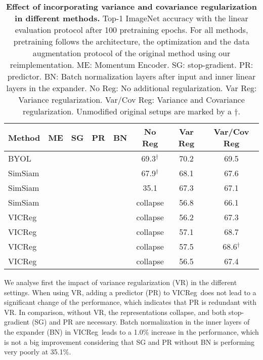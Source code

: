 \documentclass{article}
\makeatletter
\newcommand{\algo}{VICReg}
\newcommand{\expander}{expander }
\newcommand{\expandernospace}{expander}
\newcommand{\cmark}{\ding{51}}\newcommand{\bigcell}[2]{\begin{tabular}{@{}#1@{}}#2\end{tabular}}
\makeatother
\begin{document}
\begin{table}[t]
\caption{\textbf{Effect of incorporating variance and covariance regularization in different methods.} Top-1 ImageNet accuracy with the linear evaluation protocol after 100 pretraining epochs. For all methods, pretraining follows the architecture, the optimization and the data augmentation protocol of the original method using our reimplementation. ME: Momentum Encoder. SG: stop-gradient. PR: predictor. BN: Batch normalization layers after input and inner linear layers in the \expandernospace. No Reg: No additional regularization. Var Reg: Variance regularization. Var/Cov Reg: Variance and Covariance regularization. Unmodified original setups are marked by a ${\dagger}$.}
\label{tab:ablation}
\vspace{-1.5em}
\setlength{\tabcolsep}{10.5pt}
\vskip 0.15in
\begin{center}
\begin{tabular}{lcccc|ccc}
\toprule
Method & ME & SG & PR & BN & No Reg & Var Reg & Var/Cov Reg \\
\midrule
BYOL            & \cmark & \cmark & \cmark & \cmark & \hspace{0.14em} 69.3$^{\dagger}$ & 70.2 & 69.5 \\
SimSiam         &        & \cmark & \cmark & \cmark & \hspace{0.14em} 67.9$^{\dagger}$ & 68.1 & 67.6 \\
SimSiam         &        & \cmark & \cmark &        & 35.1      & 67.3 & 67.1 \\
SimSiam         &        & \cmark &        &        & collapse  & 56.8 & 66.1 \\
\algo           &        &        & \cmark &        & collapse  & 56.2 & 67.3 \\
\algo           &        &        & \cmark & \cmark & collapse  & 57.1 & 68.7 \\
\algo           &        &        &        & \cmark & collapse  & 57.5 & \hspace{0.14em} 68.6$^{\dagger}$ \\
\algo           &        &        &        &        & collapse  & 56.5 & 67.4 \\
\bottomrule
\end{tabular}
\end{center}
\vspace{-2mm}
\end{table}


We analyse first the impact of variance regularization (VR) in the different settings. When using VR, adding a predictor (PR) to \algo \ does not lead to a significant change of the performance, which indicates that PR is redundant with VR. In comparison, without VR, the representations collapse, and both stop-gradient (SG) and PR are necessary. Batch normalization in the inner layers of the \expander (BN) in \algo \ leads to a 1.0\% increase in the performance, which is not a big improvement considering that SG and PR without BN is performing very poorly at 35.1\%. 
\end{document}
